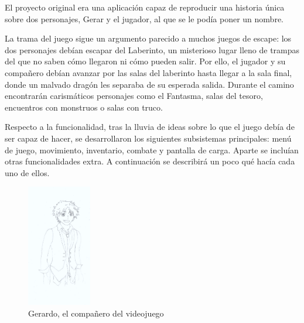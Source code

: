 \documentclass[12pt]{article}
\begin{document}
El proyecto original era una aplicación capaz de reproducir una historia única sobre dos personajes, Gerar y el jugador, al que se le podía poner un nombre.

La trama del juego sigue un argumento parecido a muchos juegos de escape: los dos personajes debían escapar del Laberinto, un misterioso lugar lleno de trampas del que no saben cómo llegaron ni cómo pueden salir. Por ello, el jugador y su compañero debían avanzar por las salas del laberinto hasta llegar a la sala final, donde un malvado dragón les separaba de su esperada salida. Durante el camino encontrarán carismáticos personajes como el Fantasma, salas del tesoro, encuentros con monstruos o salas con truco.

Respecto a la funcionalidad, tras la lluvia de ideas sobre lo que el juego debía de ser capaz de hacer, se desarrollaron los siguientes subsistemas principales: menú de juego, movimiento, inventario, combate y pantalla de carga. Aparte se incluían otras funcionalidades extra.
A continuación se describirá un poco qué hacía cada uno de ellos.

\begin{figure}[h]
	\caption{Gerardo, el compañero del videojuego}
	\centering
	\includegraphics[width=0.25\textwidth]{GerardoPres.png}
\end{figure}
\end{document}
